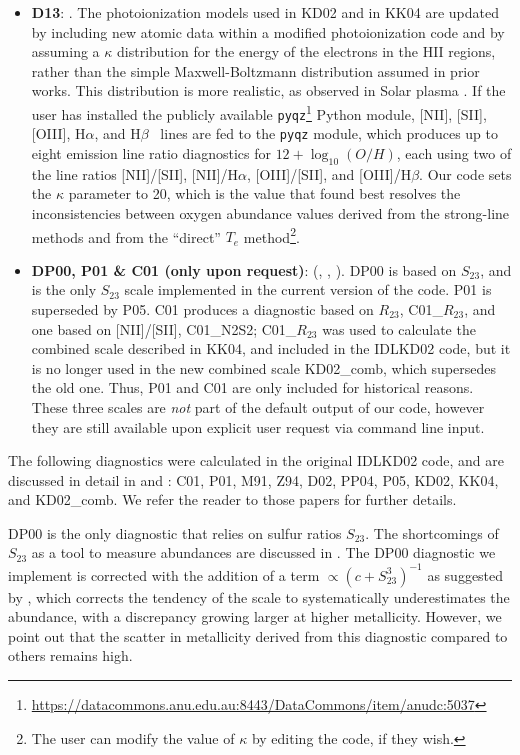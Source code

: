 \documentclass{emulateapj}
\newcommand{\oxabinline}{\ensuremath{12 + \log_{10}(O/H)}}
\newcommand{\ha}{\ensuremath{\mathrm{H}\alpha}}
\newcommand{\hb}{\ensuremath{\mathrm{H}\beta}}
\begin{document}
\begin{itemize}
\item {\bf D13}: \citep{dopita13}. The photoionization models used in KD02 and in KK04 are updated by including new atomic data within a modified photoionization code and by assuming a $\kappa$ distribution for the energy of the electrons in the HII regions, rather than the simple Maxwell-Boltzmann distribution assumed in prior works. This distribution is more realistic, as observed in Solar plasma \citep{nicholls12}. If the user has installed the publicly available \verb=pyqz=\footnote{\url{https://datacommons.anu.edu.au:8443/DataCommons/item/anudc:5037}} Python module, [NII], [SII], [OIII], \ha, and \hb~ lines are fed to the \verb=pyqz= module, which produces up to eight emission line ratio diagnostics for \oxabinline, each using two of the line ratios [NII]/[SII], [NII]/\ha, [OIII]/[SII], and [OIII]/\hb. Our code sets the $\kappa$ parameter to 20, which is the value that \citet{dopita13} found best resolves the inconsistencies between oxygen abundance values derived from the strong-line methods and from the ``direct'' $T_e$ method\footnote{The user can modify the value of $\kappa$ by editing the code, if they wish.}.
\item{\bf DP00, P01 \& C01 (only upon request)}: (\citealt{diaz00}, \citealt{pilyugin01}, \citealt{charlot01}). DP00 is based on $S_{23}$, and is the only $S_{23}$ scale implemented in the current version of the code. P01 is superseded by P05. C01 produces a diagnostic based on $R_{23}$, C01\_$R_{23}$, and one based on [NII]/[SII], C01\_N2S2; C01\_$R_{23}$ was used to calculate the combined scale described in KK04, and included in the IDLKD02 code, but it is no longer used in the new combined scale KD02\_comb, which supersedes the old one. Thus, P01 and C01 are only included for historical reasons. These three scales are \emph{not} part of the default output of our code, however they are still available upon explicit user request via command line input.

\end{itemize}

The following diagnostics were calculated in the original IDLKD02 code, and are discussed in detail in \citet{kewley02} and \citet{kewley08}: C01, P01, M91, Z94, D02, PP04, P05, KD02, KK04, and KD02\_comb. We refer the reader to those papers for further details.

DP00 is the only diagnostic that relies on sulfur ratios $S_{23}$.
The shortcomings of $S_{23}$ as a tool to measure abundances are discussed in \citet{kewley02}.
The DP00 diagnostic we implement is corrected with the addition of a term $\propto (c+S_{23}^3)^{-1}$ as suggested by \citet{kewley02}, which corrects the tendency of the scale to systematically underestimates the abundance, with a discrepancy growing larger at higher metallicity. However, we point out that the scatter in metallicity derived from this diagnostic compared to others remains high. 
\end{document}
